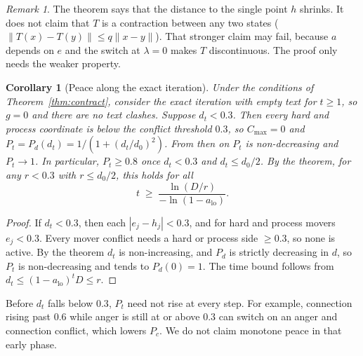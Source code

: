 \documentclass[10pt]{article}
\newtheorem{corollary}{Corollary}
\theoremstyle{definition}
\theoremstyle{remark}
\newtheorem*{remark}{Remark}
\newcommand{\norm}[1]{\lVert #1\rVert}
\begin{document}
\begin{remark}
The theorem says that the distance to the single point $h$ shrinks. It does not claim that $T$ is a contraction between any two states ($\norm{T(x)-T(y)}\le q\norm{x-y}$). That stronger claim may fail, because $a$ depends on $e$ and the switch at $\lambda=0$ makes $T$ discontinuous. The proof only needs the weaker property.
\end{remark}

\begin{corollary}[Peace along the exact iteration]
\label{cor:peace}
Under the conditions of Theorem~\ref{thm:contract}, consider the exact iteration with empty text for $t\ge1$, so $g=0$ and there are no text clashes. Suppose $d_t<0.3$. Then every hard and process coordinate is below the conflict threshold $0.3$, so $C_{\max}=0$ and $P_t=P_d(d_t)=1/(1+(d_t/d_0)^2)$. From then on $P_t$ is non-decreasing and $P_t\to1$. In particular, $P_t\ge0.8$ once $d_t<0.3$ and $d_t\le d_0/2$. By the theorem, for any $r<0.3$ with $r\le d_0/2$, this holds for all
\[
t \;\ge\; \frac{\ln(D/r)}{-\ln(1-a_{\mathrm{lo}})}.
\]
\end{corollary}
\begin{proof}
If $d_t<0.3$, then each $|e_j-h_j|<0.3$, and for hard and process movers $e_j<0.3$. Every mover conflict needs a hard or process side $\ge0.3$, so none is active. By the theorem $d_t$ is non-increasing, and $P_d$ is strictly decreasing in $d$, so $P_t$ is non-decreasing and tends to $P_d(0)=1$. The time bound follows from $d_t\le(1-a_{\mathrm{lo}})^t D\le r$.
\end{proof}

Before $d_t$ falls below $0.3$, $P_t$ need not rise at every step. For example, connection rising past $0.6$ while anger is still at or above $0.3$ can switch on an anger and connection conflict, which lowers $P_c$. We do not claim monotone peace in that early phase.
\end{document}
